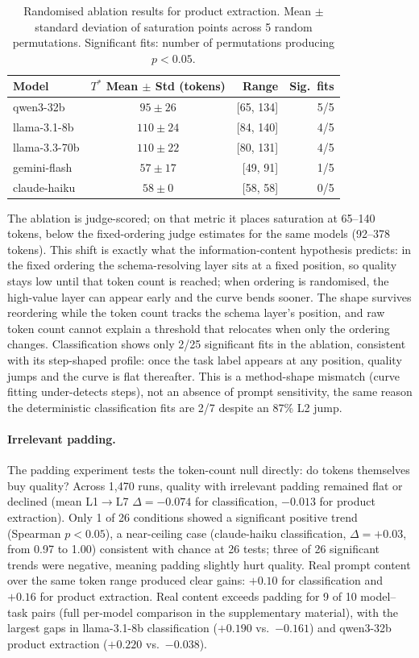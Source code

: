\begin{table}[t]
\centering
\caption{Randomised ablation results for product extraction.
  Mean $\pm$ standard deviation of saturation points across 5 random
  permutations.
  Significant fits: number of permutations producing $p < 0.05$.}
\label{tab:ablation}
\small
\begin{tabular}{lcrr}
\toprule
Model & $T^*$ Mean $\pm$ Std (tokens) & Range & Sig.\ fits \\
\midrule
qwen3-32b     & $95 \pm 26$  & [65, 134]  & 5/5 \\
llama-3.1-8b  & $110 \pm 24$ & [84, 140]  & 4/5 \\
llama-3.3-70b & $110 \pm 22$ & [80, 131]  & 4/5 \\
gemini-flash  & $57 \pm 17$  & [49, 91]   & 1/5 \\
claude-haiku  & $58 \pm 0$   & [58, 58]   & 0/5 \\
\bottomrule
\end{tabular}
\end{table}

The ablation is judge-scored; on that metric it places saturation at 65--140
tokens, below the fixed-ordering judge estimates for the same models (92--378
tokens). This shift is exactly what the information-content hypothesis predicts:
in the fixed ordering the schema-resolving layer sits at a fixed position, so
quality stays low until that token count is reached; when ordering is
randomised, the high-value layer can appear early and the curve bends sooner.
The shape survives reordering while the token count tracks the schema layer's
position, and raw token count cannot explain a threshold that relocates when
only the ordering changes. Classification shows only 2/25 significant fits in
the ablation, consistent with its step-shaped profile: once the task label
appears at any position, quality jumps and the curve is flat thereafter. This is
a method-shape mismatch (curve fitting under-detects steps), not an absence of
prompt sensitivity, the same reason the deterministic classification fits are
2/7 despite an 87\% L2 jump.

\paragraph{Irrelevant padding.}
The padding experiment tests the token-count null directly: do tokens themselves
buy quality? Across 1,470 runs, quality with irrelevant padding remained flat or
declined (mean L1$\to$L7 $\Delta = -0.074$ for classification, $-0.013$ for
product extraction). Only 1 of 26 conditions showed a significant positive trend
(Spearman $p < 0.05$), a near-ceiling case (claude-haiku classification,
$\Delta = +0.03$, from 0.97 to 1.00) consistent with chance at 26 tests; three
of 26 significant trends were negative, meaning padding slightly hurt quality.
Real prompt content over the same token range produced clear gains: $+0.10$ for
classification and $+0.16$ for product extraction. Real content exceeds padding
for 9 of 10 model--task pairs (full per-model comparison in the supplementary
material), with the largest gaps in llama-3.1-8b classification ($+0.190$ vs.\
$-0.161$) and qwen3-32b product extraction ($+0.220$ vs.\ $-0.038$).

